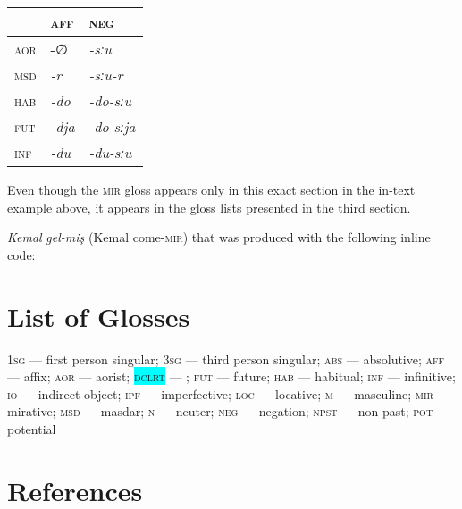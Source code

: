 \documentclass[
]{article}
\begin{document}
\begin{longtable}[]{@{}lll@{}}
\toprule
& \textsc{aff} & \textsc{neg} \\
\midrule
\endhead
\textsc{aor} & -∅ & \emph{-sːu} \\
\textsc{msd} & \emph{-r} & \emph{-sːu-r} \\
\textsc{hab} & \emph{-do} & \emph{-do-sːu} \\
\textsc{fut} & \emph{-dja} & \emph{-do-sːja} \\
\textsc{inf} & \emph{-du} & \emph{-du-sːu} \\
\bottomrule
\end{longtable}

Even though the \textsc{mir} gloss appears only in this exact section in
the in-text example above, it appears in the gloss lists presented in
the third section.

\textit{Kemal} \textit{gel-miş} (Kemal come-\textsc{mir}) that was
produced with the following inline code:

\hypertarget{list-of-glosses}{%
\section{List of Glosses}\label{list-of-glosses}}

\textsc{1sg} --- first person singular; \textsc{3sg} --- third person
singular; \textsc{abs} --- absolutive; \textsc{aff} --- affix;
\textsc{aor} --- aorist; \textsc{\colorbox{cyan}{dclrt}} --- ;
\textsc{fut} --- future; \textsc{hab} --- habitual; \textsc{inf} ---
infinitive; \textsc{io} --- indirect object; \textsc{ipf} ---
imperfective; \textsc{loc} --- locative; \textsc{m} --- masculine;
\textsc{mir} --- mirative; \textsc{msd} --- masdar; \textsc{n} ---
neuter; \textsc{neg} --- negation; \textsc{npst} --- non-past;
\textsc{pot} --- potential

\hypertarget{references}{%
\section{References}\label{references}}
\end{document}
